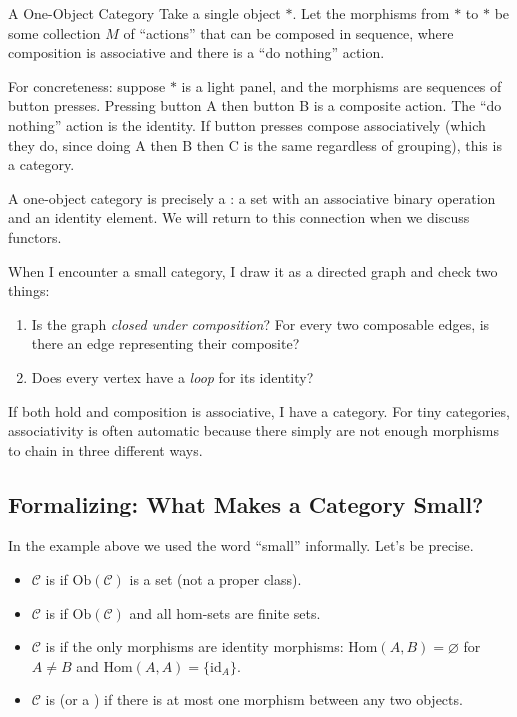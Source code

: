 \begin{example}{A One-Object Category}
Take a single object $*$. Let the morphisms from $*$ to $*$ be some
collection $M$ of ``actions'' that can be composed in sequence, where
composition is associative and there is a ``do nothing'' action.

For concreteness: suppose $*$ is a light panel, and the morphisms are
sequences of button presses. Pressing button A then button B is a composite
action. The ``do nothing'' action is the identity. If button presses compose
associatively (which they do, since doing A then B then C is the same
regardless of grouping), this is a category.

A one-object category is precisely a : a set with an
associative binary operation and an identity element. We will return to
this connection when we discuss functors.
\end{example}

\begin{dialog}
When I encounter a small category, I draw it as a directed graph and check
two things:
\begin{enumerate}
  \item Is the graph \emph{closed under composition}? For every two
        composable edges, is there an edge representing their composite?
  \item Does every vertex have a \emph{loop} for its identity?
\end{enumerate}
If both hold and composition is associative, I have a category. For tiny
categories, associativity is often automatic because there simply are not
enough morphisms to chain in three different ways.
\end{dialog}

\subsection{Formalizing: What Makes a Category Small?}

In the example above we used the word ``small'' informally. Let's be
precise.

\begin{itemize}
  \item $\mathcal{C}$ is  if $\mathrm{Ob}(\mathcal{C})$ is a
        set (not a proper class).
  \item $\mathcal{C}$ is  if $\mathrm{Ob}(\mathcal{C})$ and all
        hom-sets are finite sets.
  \item $\mathcal{C}$ is  if the only morphisms are
        identity morphisms: $\mathrm{Hom}(A,B) = \varnothing$ for $A \neq B$
        and $\mathrm{Hom}(A,A) = \{\mathrm{id}_A\}$.
  \item $\mathcal{C}$ is  (or a ) if there is at
        most one morphism between any two objects.
\end{itemize}

